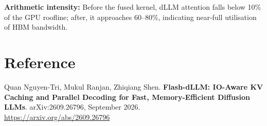 \documentclass[10pt,twocolumn]{article}
\begin{document}
\textbf{Arithmetic intensity:} Before the fused kernel, dLLM attention falls
below 10\% of the GPU roofline; after, it approaches 60--80\%, indicating
near-full utilisation of HBM bandwidth.

\section*{Reference}

Quan Nguyen-Tri, Mukul Ranjan, Zhiqiang Shen.
\textbf{Flash-dLLM: IO-Aware KV Caching and Parallel Decoding for Fast,
Memory-Efficient Diffusion LLMs}.
arXiv:2609.26796, September 2026.\\
\url{https://arxiv.org/abs/2609.26796}
\end{document}
